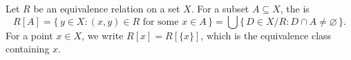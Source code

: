 Let $R$ be an equivalence relation on a set $X$. For a subset $A \subseteq X$, the  is
$$R[A] = \{\, y \in X : (x,y) \in R \text{ for some } x \in A \,\} = \bigcup \{\, D \in X/R : D \cap A \neq \varnothing \,\}.$$
For a point $x \in X$, we write $R[x] = R[\{x\}]$, which is the equivalence class containing $x$.
